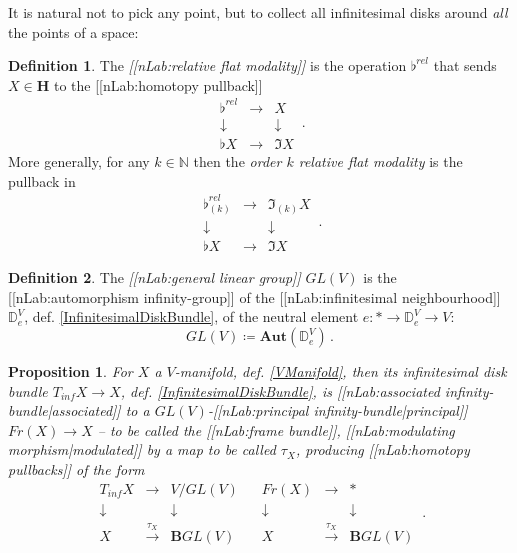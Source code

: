 \documentclass[12pt,titlepage]{article}
\newcommand{\itexarray}[1]{\begin{matrix}#1\end{matrix}}
\theoremstyle{plain}
\newtheorem{prop}{Proposition}
\theoremstyle{definition}
\newtheorem{defn}{Definition}
\theoremstyle{remark}
\begin{document}
It is natural not to pick any point, but to collect all infinitesimal disks around \emph{all} the points of a space:
\begin{defn}
\label{RelativeFlat}\hypertarget{RelativeFlat}{}
The \emph{[[nLab:relative flat modality]]} is the operation $\flat^{rel}$ that sends $X \in \mathbf{H}$ to the [[nLab:homotopy pullback]]
\begin{displaymath}
\itexarray{
    \flat^{rel} &\longrightarrow& X
    \\
    \downarrow && \downarrow
    \\
    \flat X &\longrightarrow& \Im X
  }
  \,.
\end{displaymath}
More generally, for any $k \in \mathbb{N}$ then the \emph{order $k$ relative flat modality} is the pullback in
\begin{displaymath}
\itexarray{
    \flat^{rel}_{(k)} &\longrightarrow& \Im_{(k)} X
    \\
    \downarrow && \downarrow
    \\
    \flat X &\longrightarrow& \Im X
  }
  \,.
\end{displaymath}
\end{defn}
\begin{defn}
\label{GeneralLinearGroup}\hypertarget{GeneralLinearGroup}{}
The \emph{[[nLab:general linear group]]} $GL(V)$ is the [[nLab:automorphism infinity-group]] of the [[nLab:infinitesimal neighbourhood]] $\mathbb{D}^V_e$, def. \ref{InfinitesimalDiskBundle}, of the neutral element $e \colon \ast \to \mathbb{D}^V_e \to V$:
\begin{displaymath}
GL(V) \coloneqq \mathbf{Aut}(\mathbb{D}^V_e)
  \,.
\end{displaymath}
\end{defn}
\begin{prop}
\label{FrameBundle}\hypertarget{FrameBundle}{}
For $X$ a $V$-manifold, def. \ref{VManifold}, then its infinitesimal disk bundle $T_{inf} X \to X$, def. \ref{InfinitesimalDiskBundle}, is [[nLab:associated infinity-bundle|associated]] to a $GL(V)$-[[nLab:principal infinity-bundle|principal]] $Fr(X) \to X$ -- to be called the \emph{[[nLab:frame bundle]]}, [[nLab:modulating morphism|modulated]] by a map to be called $\tau_X$, producing [[nLab:homotopy pullbacks]] of the form
\begin{displaymath}
\itexarray{
     T_{inf} X &\longrightarrow& V/GL(V)
     \\
     \downarrow && \downarrow
     \\
     X &\stackrel{\tau_X}{\longrightarrow}& \mathbf{B} GL(V)
  }
  \;\;\;
  \itexarray{
     Fr(X) &\longrightarrow& \ast
     \\
     \downarrow && \downarrow
     \\
     X &\stackrel{\tau_X}{\longrightarrow}& \mathbf{B} GL(V)
  }
  \,.
\end{displaymath}
\end{prop}
\end{document}
